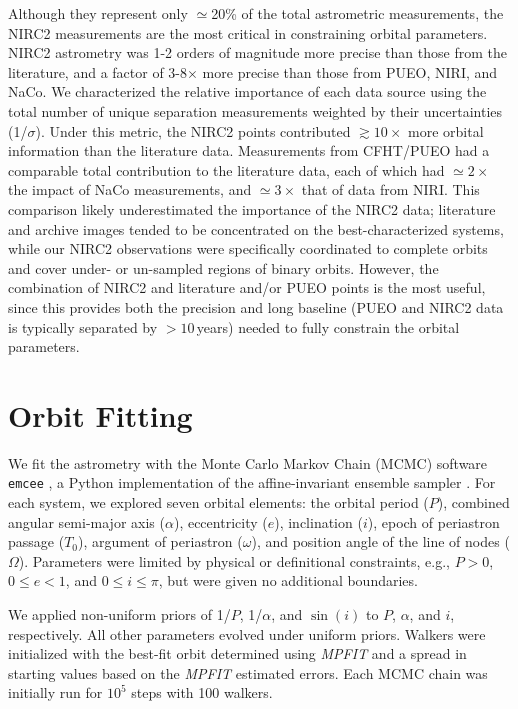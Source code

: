 \documentclass[twocolumn]{aastex62}
\begin{document}
Although they represent only $\simeq$20\% of the total astrometric measurements, the NIRC2 measurements are the most critical in constraining orbital parameters. NIRC2 astrometry was 1-2 orders of magnitude more precise than those from the literature, and a factor of 3-8$\times$ more precise than those from PUEO, NIRI, and NaCo. We characterized the relative importance of each data source using the total number of unique separation measurements weighted by their uncertainties (1/$\sigma$). Under this metric, the NIRC2 points contributed $\gtrsim10\times$ more orbital information than the literature data. Measurements from CFHT/PUEO had a comparable total contribution to the literature data, each of which had $\simeq2\times$ the impact of NaCo measurements, and $\simeq3\times$ that of data from NIRI. This comparison likely underestimated the importance of the NIRC2 data; literature and archive images tended to be concentrated on the best-characterized systems, while our NIRC2 observations were specifically coordinated to complete orbits and cover under- or un-sampled regions of binary orbits. However, the combination of NIRC2 and literature and/or PUEO points is the most useful, since this provides both the precision and long baseline (PUEO and NIRC2 data is typically separated by $>10$\,years) needed to fully constrain the orbital parameters.

\section{Orbit Fitting}\label{sec:orbit}

We fit the astrometry with the Monte Carlo Markov Chain (MCMC) software {\tt emcee} \citep{Foreman-Mackey2013}, a Python implementation of the affine-invariant ensemble sampler \citep{goodman2010}. For each system, we explored seven orbital elements: the orbital period ($P$), combined angular semi-major axis ($\alpha$), eccentricity ($e$), inclination ($i$), epoch of periastron passage ($T_0$), argument of periastron ($\omega$), and position angle of the line of nodes ($\Omega$). Parameters were limited by physical or definitional constraints, e.g., $P>0$, $0 \le e<1$, and $0\le i \le \pi$, but were given no additional boundaries. 

We applied non-uniform priors of 1/$P$, 1/$\alpha$, and $\sin(i)$ to $P$, $\alpha$, and $i$, respectively. All other parameters evolved under uniform priors. Walkers were initialized with the best-fit orbit determined using \textit{MPFIT} \citep{Markwart2009} and a spread in starting values based on the \textit{MPFIT} estimated errors. Each MCMC chain was initially run for $10^5$ steps with 100 walkers. 
\end{document}
